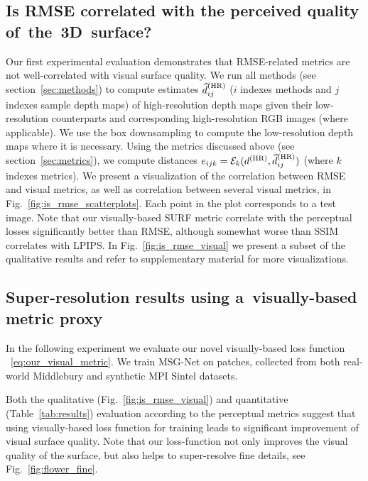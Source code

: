 \subsection{Is RMSE correlated with the perceived quality of~the~3D~surface?}
\label{subsec:is_rmse_correlated}
Our first experimental evaluation demonstrates that
RMSE-related metrics are not well-correlated with visual surface quality. 
We run all  methods (see section~\ref{sec:methods}) to compute estimates $\widehat{d}^{\mathrm{(HR)}}_{ij}$ ($i$ indexes methods and $j$ indexes sample depth maps)
of high-resolution depth maps given their low-resolution counterparts
and corresponding high-resolution RGB images (where applicable). We use the box downsampling to compute the low-resolution depth maps where it is necessary. Using the metrics discussed above (see section~\ref{sec:metrics}), we compute 
distances $e_{ijk} = \mathcal{E}_k(d^{\mathrm{(HR)}}, \widehat{d}^{\mathrm{(HR)}}_{ij})$ (where $k$ indexes metrics).
We present a visualization of the correlation between RMSE and visual metrics,
as well as correlation between several visual metrics,
in Fig.~\ref{fig:is_rmse_scatterplots}.  Each point in the plot corresponds to a test image.
Note that our visually-based SURF metric correlate with the perceptual losses significantly better than RMSE, although somewhat 
worse than SSIM correlates with LPIPS.
In Fig.~\ref{fig:is_rmse_visual} we present a subset of the qualitative
results and refer to supplementary material for more visualizations. 

\subsection{Super-resolution results using a~visually-based metric proxy}
\label{subsec:visually_based_proxy}
In the following experiment we evaluate our novel visually-based loss function ~\eqref{eq:our_visual_metric}. %
We train MSG-Net on patches, collected from both real-world Middlebury and synthetic MPI Sintel \cite{Butler:ECCV:2012} datasets.

Both the qualitative (Fig.~\ref{fig:is_rmse_visual}) and quantitative (Table~\ref{tab:results}) evaluation according to the perceptual metrics suggest that using visually-based loss function for training leads to significant improvement of visual surface quality. Note that our loss-function not only improves the visual quality of the surface, but also helps to super-resolve fine details, see Fig.~\ref{fig:flower_fine}.

